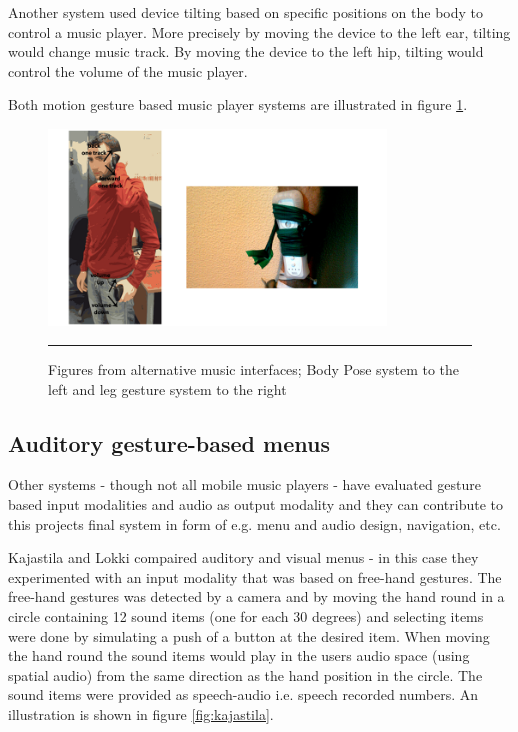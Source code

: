 Another system \cite{strachan_bodyspace_2007} used device tilting based on specific positions on the body to control a music player. More precisely by moving the device to the left ear, tilting would change music track. By moving the device to the left hip, tilting would control the volume of the music player.

Both motion gesture based music player systems are illustrated in figure \ref{fig:bodyandleg}.

\begin{figure}[t]
	\centering
		\includegraphics[width=0.8\textwidth,height=\textheight,keepaspectratio]{./Figures/bodyposeandleg.png}
		\rule{35em}{0.5pt}
	\caption[Alternative music players]{Figures from alternative music interfaces; Body Pose system \cite{strachan_bodyspace_2007} to the left and leg gesture system \cite{smus_running_2010} to the right}
	\label{fig:bodyandleg}
\end{figure}

\subsection{Auditory gesture-based menus}
\label{sec:auditorygesturebasedmenus}
Other systems - though not all mobile music players - have evaluated gesture based input modalities and audio as output modality and they can contribute to this projects final system in form of e.g. menu and audio design, navigation, etc.

Kajastila and Lokki \cite{kajastila_eyes-free_2013} compaired auditory and visual menus - in this case they experimented with an input modality that was based on free-hand gestures. The free-hand gestures was detected by a camera and by moving the hand round in a circle containing 12 sound items (one for each 30 degrees) and selecting items were done by simulating a push of a button at the desired item. When moving the hand round the sound items would play in the users audio space (using spatial audio) from the same direction as the hand position in the circle. The sound items were provided as speech-audio i.e. speech recorded numbers. An illustration is shown in figure \ref{fig:kajastila}.

